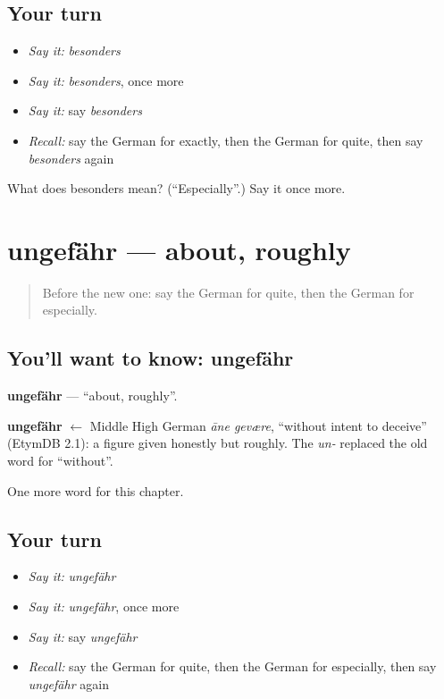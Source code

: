 \subsection*{Your turn}
\begin{itemize}
\raggedright
  \item \emph{Say it:} \emph{besonders}
  \item \emph{Say it:} \emph{besonders}, once more
  \item \emph{Say it:} say \emph{besonders}
  \item \emph{Recall:} say the German for exactly, then the German for quite, then say \emph{besonders} again
\end{itemize}

\begin{tcolorbox}[breakable,colback=teal!4,colframe=teal!35!black,title={Before you move on}]
What does besonders mean? (\textquotedblleft{}Especially\textquotedblright{}.) Say it once more.
\end{tcolorbox}
\section[ungefähr]{ungefähr — about, roughly}

\label{lesson:GE-C173-ungefaehr}



\begin{quote}
Before the new one: say the German for quite, then the German for especially.
\end{quote}

\subsection*{You'll want to know: ungefähr}
\textbf{ungefähr} — \textquotedblleft{}about, roughly\textquotedblright{}.

\begin{cousinweb}
\textbf{ungefähr} $\leftarrow$ Middle High German \emph{āne gevære}, \textquotedblleft{}without intent to deceive\textquotedblright{} (EtymDB 2.1): a figure given honestly but roughly. The \emph{un-} replaced the old word for \textquotedblleft{}without\textquotedblright{}.
\end{cousinweb}

\begin{grammarlens}[title={What you've built}]
One more word for this chapter.
\end{grammarlens}

\subsection*{Your turn}
\begin{itemize}
\raggedright
  \item \emph{Say it:} \emph{ungefähr}
  \item \emph{Say it:} \emph{ungefähr}, once more
  \item \emph{Say it:} say \emph{ungefähr}
  \item \emph{Recall:} say the German for quite, then the German for especially, then say \emph{ungefähr} again
\end{itemize}

